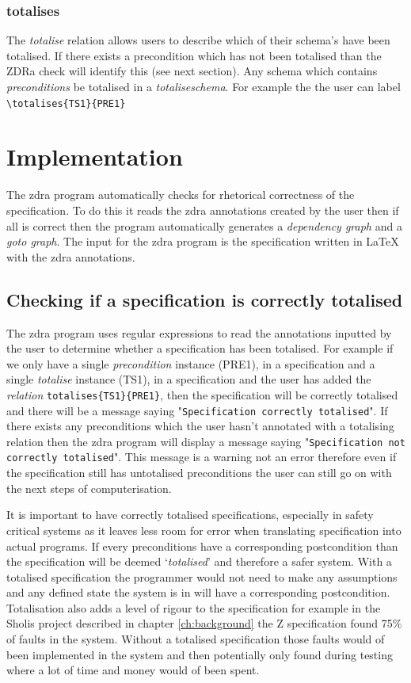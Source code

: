 \subsubsection{totalises}
The \emph{totalise} relation allows users to describe which of their schema's
have been totalised. If there exists a precondition which has not been totalised
than the ZDRa check will identify this (see next section). Any schema which
contains \emph{preconditions} be totalised in a \emph{totaliseschema}. For
example the the user can label \verb|\totalises{TS1}{PRE1}|


\section{Implementation}
\label{sec:zdra_implement}

The \gls{zdra} program automatically checks for rhetorical correctness of the
specification. To do this it reads the \gls{zdra} annotations created by the
user then if all is correct then the program automatically generates a
\emph{dependency graph} and a \emph{goto graph}. The input for the \gls{zdra}
program is the specification written in \LaTeX{} with the \gls{zdra}
annotations.

\subsection{Checking if a specification is correctly totalised}

The \gls{zdra} program uses regular expressions to read the annotations inputted
by the user to determine whether a specification has been totalised. For example
if we only have a single \emph{precondition} instance (PRE1), in a specification
and a single \emph{totalise} instance (TS1), in a specification and the user has
added the \emph{relation} \verb|totalises{TS1}{PRE1}|, then the specification
will be correctly totalised and there will be a message saying
"\texttt{Specification correctly totalised}". If there exists any preconditions
which the user hasn't annotated with a totalising relation then the \gls{zdra}
program will display a message saying "\texttt{Specification not correctly
totalised}". This message is a warning not an error therefore even if the
specification still has untotalised preconditions the user can still go on with
the next steps of computerisation.

It is important to have correctly totalised specifications, especially in safety
critical systems as it leaves less room for error when translating specification
into actual programs. If every preconditions have a corresponding postcondition
than the specification will be deemed `\emph{totalised}' and therefore a safer
system. With a totalised specification the programmer would not need to make any
assumptions and any defined state the system is in will have a corresponding
postcondition. Totalisation also adds a level of rigour to the specification for
example in the Sholis project \cite{sholis} described in chapter
\ref{ch:background} the Z specification found 75\% of faults in the system.
Without a totalised specification those faults would of been implemented in the
system and then potentially only found during testing where a lot of time and
money would of been spent.

